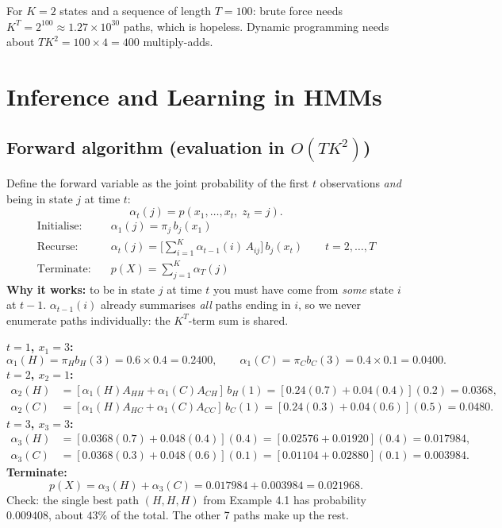 \documentclass[11pt,a4paper]{article}
\begin{document}
\begin{example}
For $K=2$ states and a sequence of length $T=100$: brute force needs $K^T=2^{100}\approx1.27\times10^{30}$ paths, which is hopeless. Dynamic programming needs about $TK^2=100\times4=400$ multiply-adds.
\end{example}

\section{Inference and Learning in HMMs}

\subsection{Forward algorithm (evaluation in \texorpdfstring{$O(TK^2)$}{O(TK^2)})}

Define the forward variable as the joint probability of the first $t$ observations \emph{and} being in state $j$ at time $t$:
\[
\alpha_t(j)=p(x_1,\dots,x_t,\;z_t=j).
\]
\begin{align*}
\text{Initialise:}\quad&\alpha_1(j)=\pi_j\,b_j(x_1)\\
\text{Recurse:}\quad&\alpha_t(j)=\Big[\sum_{i=1}^K\alpha_{t-1}(i)\,A_{ij}\Big]\,b_j(x_t)\qquad t=2,\dots,T\\
\text{Terminate:}\quad&p(X)=\sum_{j=1}^K\alpha_T(j)
\end{align*}
\textbf{Why it works:} to be in state $j$ at time $t$ you must have come from \emph{some} state $i$ at $t-1$. $\alpha_{t-1}(i)$ already summarises \emph{all} paths ending in $i$, so we never enumerate paths individually: the $K^T$-term sum is shared.

\begin{example}[Example 5.1: Forward pass for $X=(3,1,3)$]
\textbf{$t=1$, $x_1=3$:}
\[
\alpha_1(H)=\pi_Hb_H(3)=0.6\times0.4=0.2400,\qquad\alpha_1(C)=\pi_Cb_C(3)=0.4\times0.1=0.0400.
\]
\textbf{$t=2$, $x_2=1$:}
\begin{align*}
\alpha_2(H)&=[\alpha_1(H)A_{HH}+\alpha_1(C)A_{CH}]\,b_H(1)=[0.24(0.7)+0.04(0.4)](0.2)=0.0368,\\
\alpha_2(C)&=[\alpha_1(H)A_{HC}+\alpha_1(C)A_{CC}]\,b_C(1)=[0.24(0.3)+0.04(0.6)](0.5)=0.0480.
\end{align*}
\textbf{$t=3$, $x_3=3$:}
\begin{align*}
\alpha_3(H)&=[0.0368(0.7)+0.048(0.4)](0.4)=[0.02576+0.01920](0.4)=0.017984,\\
\alpha_3(C)&=[0.0368(0.3)+0.048(0.6)](0.1)=[0.01104+0.02880](0.1)=0.003984.
\end{align*}
\textbf{Terminate:}
\[
p(X)=\alpha_3(H)+\alpha_3(C)=0.017984+0.003984=\mathbf{0.021968}.
\]
Check: the single best path $(H,H,H)$ from Example 4.1 has probability $0.009408$, about $43\%$ of the total. The other 7 paths make up the rest.
\end{example}
\end{document}
